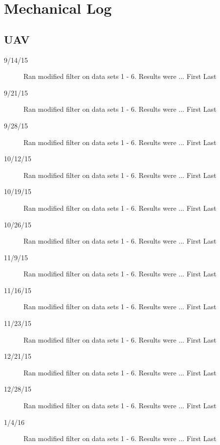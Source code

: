 \section{Mechanical Log}


\subsection{UAV}
\begin{description}
\item [9/14/15]  Ran modified filter on data sets 1 - 6.  Results were ... \hfill{First Last}

\item [9/21/15]  Ran modified filter on data sets 1 - 6.  Results were ... \hfill{First Last}

\item [9/28/15]  Ran modified filter on data sets 1 - 6.  Results were ... \hfill{First Last}

\item [10/12/15]  Ran modified filter on data sets 1 - 6.  Results were ... \hfill{First Last}

\item [10/19/15]  Ran modified filter on data sets 1 - 6.  Results were ... \hfill{First Last}

\item [10/26/15]  Ran modified filter on data sets 1 - 6.  Results were ... \hfill{First Last}

\item [11/9/15]  Ran modified filter on data sets 1 - 6.  Results were ... \hfill{First Last}

\item [11/16/15]  Ran modified filter on data sets 1 - 6.  Results were ... \hfill{First Last}

\item [11/23/15]  Ran modified filter on data sets 1 - 6.  Results were ... \hfill{First Last}

\item [12/21/15]  Ran modified filter on data sets 1 - 6.  Results were ... \hfill{First Last}

\item [12/28/15]  Ran modified filter on data sets 1 - 6.  Results were ... \hfill{First Last}

\item [1/4/16]  Ran modified filter on data sets 1 - 6.  Results were ... \hfill{First Last}


\end{description}
